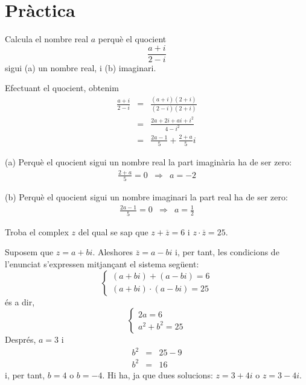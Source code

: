 \chapter{Pràctica}
\label{cap:practica}
\begin{exercici}
Calcula el nombre real $a$ perquè el quocient
\[
\frac{a+i}{2-i}
\]
sigui (a) un nombre real, i (b) imaginari.
\end{exercici}

\begin{solucio}
Efectuant el quocient, obtenim
\begin{eqnarray*}
\frac{a+i}{2-i} &=&\frac{(a+i)(2+i)}{(2-i)(2+i)} \\
&=&\frac{2a+2i+ai+i^{2}}{4-i^{2}} \\
&=&\frac{2a-1}{5}+\frac{2+a}{5}i
\end{eqnarray*}

(a) Perquè el quocient sigui un nombre real la part imaginària ha de ser
zero:
\[
\begin{array}{lll}
\frac{2+a}{5}=0 & \Longrightarrow & a=-2
\end{array}
\]

(b) Perquè el quocient sigui un nombre imaginari la part real ha de ser
zero:
\[
\begin{array}{lll}
\frac{2a-1}{5}=0 & \Longrightarrow & a=\frac{1}{2}
\end{array}
\]
\end{solucio}

\begin{exercici}
Troba el complex $z$ del qual se sap que $z+\overline{z}=6$ i $z\cdot
\overline{z}=25$.
\end{exercici}

\begin{solucio}
Suposem que $z=a+bi$. Aleshores $\overline{z}=a-bi$ i, per tant, les
condicions de l’enunciat s’expressen mitjançant el sistema següent:
\[
\left\{
\begin{array}{l}
(a+bi)+(a-bi)=6 \\
(a+bi)\cdot (a-bi)=25
\end{array}
\right.
\]
és a dir,
\[
\left\{
\begin{array}{l}
2a=6 \\
a^{2}+b^{2}=25
\end{array}
\right.
\]
Després, $a=3$ i
\begin{eqnarray*}
b^{2} &=&25-9 \\
b^{2} &=&16
\end{eqnarray*}
i, per tant, $b=4$ o $b=-4$. Hi ha, ja que dues solucions: $z=3+4i$ o $z=3-4i$.
\end{solucio}

